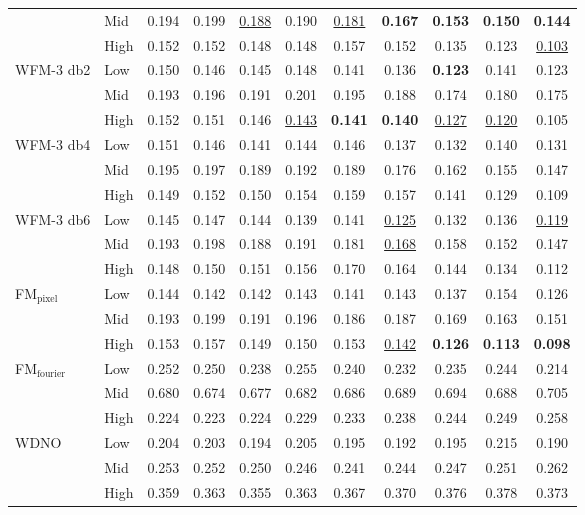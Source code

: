 \begin{table}[ht]
{\begin{tabular}{llccccccccc}
 & Mid & 0.194 & 0.199 & \underline{0.188} & 0.190 & \underline{0.181} & \textbf{0.167} & \textbf{0.153} & \textbf{0.150} & \textbf{0.144} \\
 & High & 0.152 & 0.152 & 0.148 & 0.148 & 0.157 & 0.152 & 0.135 & 0.123 & \underline{0.103} \\
\midrule
\multirow{3}{*}{WFM-3 db2} & Low & 0.150 & 0.146 & 0.145 & 0.148 & 0.141 & 0.136 & \textbf{0.123} & 0.141 & 0.123 \\
 & Mid & 0.193 & 0.196 & 0.191 & 0.201 & 0.195 & 0.188 & 0.174 & 0.180 & 0.175 \\
 & High & 0.152 & 0.151 & 0.146 & \underline{0.143} & \textbf{0.141} & \textbf{0.140} & \underline{0.127} & \underline{0.120} & 0.105 \\
\midrule
\multirow{3}{*}{WFM-3 db4} & Low & 0.151 & 0.146 & 0.141 & 0.144 & 0.146 & 0.137 & 0.132 & 0.140 & 0.131 \\
 & Mid & 0.195 & 0.197 & 0.189 & 0.192 & 0.189 & 0.176 & 0.162 & 0.155 & 0.147 \\
 & High & 0.149 & 0.152 & 0.150 & 0.154 & 0.159 & 0.157 & 0.141 & 0.129 & 0.109 \\
\midrule
\multirow{3}{*}{WFM-3 db6} & Low & 0.145 & 0.147 & 0.144 & 0.139 & 0.141 & \underline{0.125} & 0.132 & 0.136 & \underline{0.119} \\
 & Mid & 0.193 & 0.198 & 0.188 & 0.191 & 0.181 & \underline{0.168} & 0.158 & 0.152 & 0.147 \\
 & High & 0.148 & 0.150 & 0.151 & 0.156 & 0.170 & 0.164 & 0.144 & 0.134 & 0.112 \\
\midrule
\multirow{3}{*}{FM$_\text{pixel}$} & Low & 0.144 & 0.142 & 0.142 & 0.143 & 0.141 & 0.143 & 0.137 & 0.154 & 0.126 \\
 & Mid & 0.193 & 0.199 & 0.191 & 0.196 & 0.186 & 0.187 & 0.169 & 0.163 & 0.151 \\
 & High & 0.153 & 0.157 & 0.149 & 0.150 & 0.153 & \underline{0.142} & \textbf{0.126} & \textbf{0.113} & \textbf{0.098} \\
\midrule
\multirow{3}{*}{FM$_\text{fourier}$} & Low & 0.252 & 0.250 & 0.238 & 0.255 & 0.240 & 0.232 & 0.235 & 0.244 & 0.214 \\
 & Mid & 0.680 & 0.674 & 0.677 & 0.682 & 0.686 & 0.689 & 0.694 & 0.688 & 0.705 \\
 & High & 0.224 & 0.223 & 0.224 & 0.229 & 0.233 & 0.238 & 0.244 & 0.249 & 0.258 \\
\midrule
\multirow{3}{*}{WDNO} & Low & 0.204 & 0.203 & 0.194 & 0.205 & 0.195 & 0.192 & 0.195 & 0.215 & 0.190 \\
 & Mid & 0.253 & 0.252 & 0.250 & 0.246 & 0.241 & 0.244 & 0.247 & 0.251 & 0.262 \\
 & High & 0.359 & 0.363 & 0.355 & 0.363 & 0.367 & 0.370 & 0.376 & 0.378 & 0.373 \\
\bottomrule
\end{tabular}
}
\end{table}
